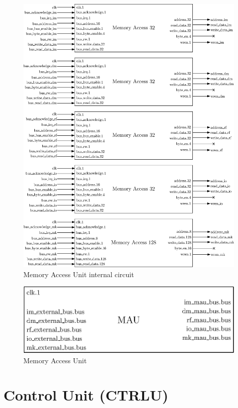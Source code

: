 \begin{figure}[ht!]
    \center
    \includegraphics[width=\linewidth]{"Chapter5-MAU_CTRLU/res/mau_in"}
    \caption{Memory Access Unit internal circuit}
    \label{fig:mau_in}
\end{figure}

\begin{figure}[ht!]
    \center
    \includegraphics[scale=0.8]{"Chapter5-MAU_CTRLU/res/mau"}
    \caption{Memory Access Unit}
    \label{fig:mau}
\end{figure}

\section{Control Unit (CTRLU)}

